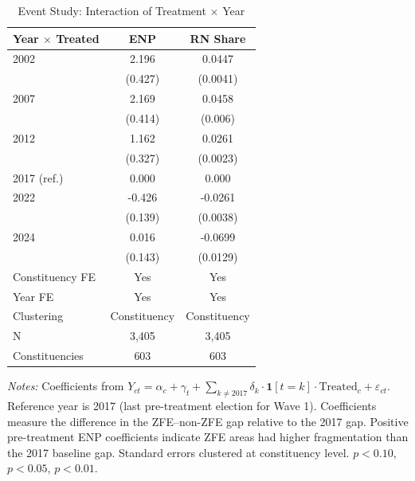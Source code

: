 \begin{table}[H]
\centering
\caption{Event Study: Interaction of Treatment $\times$ Year}
\label{tab:event_study}
\begin{threeparttable}
\begin{tabular}{lcc}
\toprule
Year $\times$ Treated & ENP & RN Share \\
\midrule
2002 & 2.196\sym{***} & 0.0447\sym{***} \\
 & (0.427) & (0.0041) \\
2007 & 2.169\sym{***} & 0.0458\sym{***} \\
 & (0.414) & (0.006) \\
2012 & 1.162\sym{***} & 0.0261\sym{***} \\
 & (0.327) & (0.0023) \\
2017 (ref.) & 0.000 & 0.000 \\
2022 & -0.426\sym{***} & -0.0261\sym{***} \\
 & (0.139) & (0.0038) \\
2024 & 0.016 & -0.0699\sym{***} \\
 & (0.143) & (0.0129) \\
\midrule
Constituency FE & Yes & Yes \\
Year FE & Yes & Yes \\
Clustering & Constituency & Constituency \\
N & 3,405 & 3,405 \\
Constituencies & 603 & 603 \\
\bottomrule
\end{tabular}
\begin{tablenotes}[flushleft]
\small
\item \textit{Notes:} Coefficients from $Y_{ct} = \alpha_c + \gamma_t + \sum_{k \neq 2017} \delta_k \cdot \mathbf{1}[t=k] \cdot \text{Treated}_c + \varepsilon_{ct}$. Reference year is 2017 (last pre-treatment election for Wave 1). Coefficients measure the difference in the ZFE--non-ZFE gap relative to the 2017 gap. Positive pre-treatment ENP coefficients indicate ZFE areas had higher fragmentation than the 2017 baseline gap. Standard errors clustered at constituency level. \sym{*} $p<0.10$, \sym{**} $p<0.05$, \sym{***} $p<0.01$.
\end{tablenotes}
\end{threeparttable}
\end{table}
